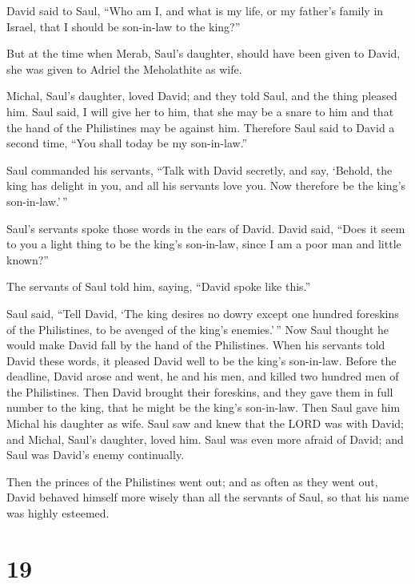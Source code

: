  David said to Saul, ``Who am I, and what is my life, or
my father's family in Israel, that I should be son-in-law to the king?''

 But at the time when Merab, Saul's daughter, should have
been given to David, she was given to Adriel the Meholathite as wife.

 Michal, Saul's daughter, loved David; and they told
Saul, and the thing pleased him.  Saul said, I will give
her to him, that she may be a snare to him and that the hand of the
Philistines may be against him. Therefore Saul said to David a second
time, ``You shall today be my son-in-law.''

 Saul commanded his servants, ``Talk with David secretly,
and say, `Behold, the king has delight in you, and all his servants love
you. Now therefore be the king's son-in-law.'\,''

 Saul's servants spoke those words in the ears of David.
David said, ``Does it seem to you a light thing to be the king's
son-in-law, since I am a poor man and little known?''

 The servants of Saul told him, saying, ``David spoke
like this.''

 Saul said, ``Tell David, `The king desires no dowry
except one hundred foreskins of the Philistines, to be avenged of the
king's enemies.'\,'' Now Saul thought he would make David fall by the
hand of the Philistines.  When his servants told David
these words, it pleased David well to be the king's son-in-law. Before
the deadline,  David arose and went, he and his men, and
killed two hundred men of the Philistines. Then David brought their
foreskins, and they gave them in full number to the king, that he might
be the king's son-in-law. Then Saul gave him Michal his daughter as
wife.  Saul saw and knew that the LORD was with David;
and Michal, Saul's daughter, loved him.  Saul was even
more afraid of David; and Saul was David's enemy continually.

 Then the princes of the Philistines went out; and as
often as they went out, David behaved himself more wisely than all the
servants of Saul, so that his name was highly esteemed.

\hypertarget{section-18}{%
\section{19}\label{section-18}}

